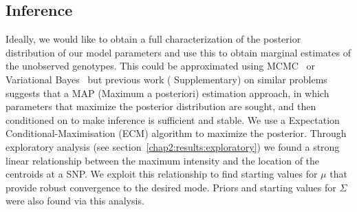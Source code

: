 
\subsection{Inference}
\label{chap2:inference}
Ideally, we would like to obtain a full characterization of the posterior distribution of our model parameters and use this to obtain marginal estimates of the unobserved genotypes. This could be approximated using MCMC~\citep{gelman2004bayesian} or Variational Bayes~\citep{archambeau2007robust} but previous work (\cite{consortium2007} Supplementary) on similar problems suggests that a MAP (Maximum a posteriori) estimation approach, in which parameters that maximize the posterior distribution are sought, and then conditioned on to make inference is sufficient and stable. We use a Expectation Conditional-Maximisation (ECM) algorithm to maximize the posterior.  Through exploratory analysis (see section~\ref{chap2:results:exploratory}) we found a strong linear relationship between the maximum intensity  and the location of the centroids at a SNP. We exploit this relationship to find starting values for $\mu$ that provide robust convergence to the desired mode.  Priors and starting values for $\Sigma$ were also found via this analysis. 

